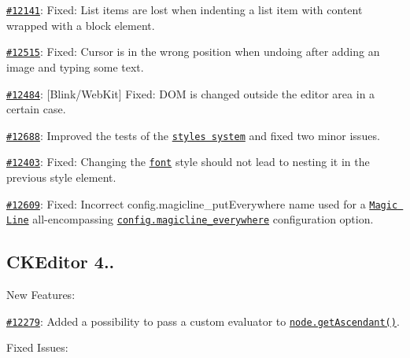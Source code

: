 \begin{DoxyItemize}
\item \href{http://dev.ckeditor.com/ticket/12141}{\tt \#12141}\+: Fixed\+: List items are lost when indenting a list item with content wrapped with a block element.
\item \href{http://dev.ckeditor.com/ticket/12515}{\tt \#12515}\+: Fixed\+: Cursor is in the wrong position when undoing after adding an image and typing some text.
\item \href{http://dev.ckeditor.com/ticket/12484}{\tt \#12484}\+: \mbox{[}Blink/\+Web\+Kit\mbox{]} Fixed\+: D\+OM is changed outside the editor area in a certain case.
\item \href{http://dev.ckeditor.com/ticket/12688}{\tt \#12688}\+: Improved the tests of the \href{http://docs.ckeditor.com/#!/api/CKEDITOR.style}{\tt styles system} and fixed two minor issues.
\item \href{http://dev.ckeditor.com/ticket/12403}{\tt \#12403}\+: Fixed\+: Changing the \href{http://ckeditor.com/addon/font}{\tt font} style should not lead to nesting it in the previous style element.
\item \href{http://dev.ckeditor.com/ticket/12609}{\tt \#12609}\+: Fixed\+: Incorrect {\ttfamily config.\+magicline\+\_\+put\+Everywhere} name used for a \href{http://ckeditor.com/addon/magicline}{\tt Magic Line} all-\/encompassing \href{http://docs.ckeditor.com/#!/api/CKEDITOR.config-cfg-magicline_everywhere}{\tt {\ttfamily config.\+magicline\+\_\+everywhere}} configuration option.
\end{DoxyItemize}

\subsection*{C\+K\+Editor 4..}

New Features\+:


\begin{DoxyItemize}
\item \href{http://dev.ckeditor.com/ticket/12279}{\tt \#12279}\+: Added a possibility to pass a custom evaluator to \href{http://docs.ckeditor.com/#!/api/CKEDITOR.dom.node-method-getAscendant}{\tt {\ttfamily node.\+get\+Ascendant()}}.
\end{DoxyItemize}

Fixed Issues\+:


